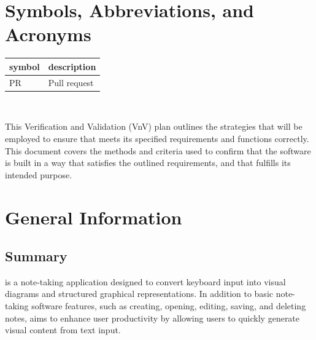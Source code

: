 \documentclass[12pt, titlepage]{article}
\begin{document}
\section{Symbols, Abbreviations, and Acronyms}

\renewcommand{\arraystretch}{1.2}
\begin{tabular}{l l}
  \toprule
  \textbf{symbol} & \textbf{description}\\
  \midrule
  PR & Pull request\\
  \bottomrule
\end{tabular}\\



\newpage


\noindent This Verification and Validation (VnV) plan outlines the strategies that
will be employed to ensure that \progname{} meets its specified requirements
and functions correctly. This document covers the methods and criteria used
to confirm that the software is built in a way that satisfies the outlined
requirements, and that fulfills its intended purpose.


\section{General Information}

\subsection{Summary}


\progname{} is a note-taking application designed to convert keyboard input into
visual diagrams and structured graphical representations. In addition to basic
note-taking software features, such as creating, opening, editing, saving, and
deleting notes, \progname{} aims to enhance user productivity by allowing users
to quickly generate visual content from text input.

\vspace{1em}
\end{document}
